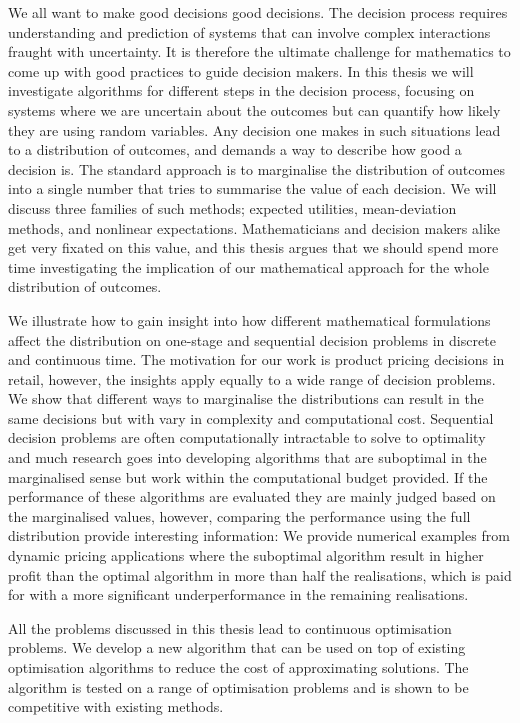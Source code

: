 \documentclass[main.tex]{subfiles}
\begin{document}
We all want to make good decisions good decisions. The decision
process requires understanding and prediction of systems that can
involve complex interactions fraught with uncertainty. It is therefore
the ultimate challenge for mathematics to come up with good practices
to guide decision makers.  In this thesis we will investigate
algorithms for different steps in the decision process, focusing on
systems where we are uncertain about the outcomes but can quantify how
likely they are using random variables.  Any decision one makes in
such situations lead to a distribution of outcomes, and demands a way
to describe how good a decision is.  The standard approach is to
marginalise the distribution of outcomes into a single number that
tries to summarise the value of each decision.  We will discuss three
families of such methods; expected utilities, mean-deviation methods,
and nonlinear expectations.  Mathematicians and decision makers alike
get very fixated on this value, and this thesis argues that we should
spend more time investigating the implication of our mathematical
approach for the whole distribution of outcomes.

We illustrate how to gain insight into how different mathematical
formulations affect the distribution on one-stage and sequential
decision problems in discrete and continuous time. The motivation for
our work is product pricing decisions in retail, however, the insights
apply equally to a wide range of decision problems.  We show that
different ways to marginalise the distributions can result in the same
decisions but with vary in complexity and computational
cost. Sequential decision problems are often computationally
intractable to solve to optimality and much research goes into
developing algorithms that are suboptimal in the marginalised sense
but work within the computational budget provided. If the performance
of these algorithms are evaluated they are mainly judged based on the
marginalised values, however, comparing the performance using the full
distribution provide interesting information: We provide numerical
examples from dynamic pricing applications where the suboptimal
algorithm result in higher profit than the optimal algorithm in more
than half the realisations, which is paid for with a more significant
underperformance in the remaining realisations.

All the problems discussed in this thesis lead to continuous
optimisation problems. We develop a new algorithm that can be used on
top of existing optimisation algorithms to reduce the cost of
approximating solutions. The algorithm is tested on a range of
optimisation problems and is shown to be competitive with existing
methods.
\end{document}
